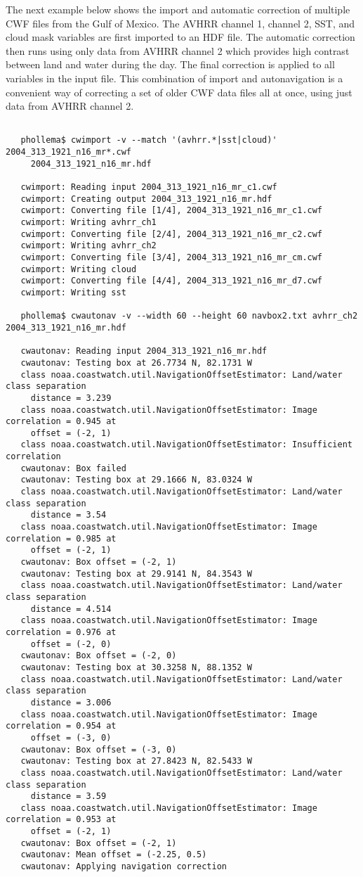  The next example below shows the import and automatic correction of multiple CWF files from the Gulf of Mexico. The AVHRR channel 1, channel 2, SST, and cloud mask variables are first imported to an HDF file. The automatic correction then runs using only data from AVHRR channel 2 which provides high contrast between land and water during the day. The final correction is applied to all variables in the input file. This combination of import and autonavigation is a convenient way of correcting a set of older CWF data files all at once, using just data from AVHRR channel 2.
\begin{verbatim}

   phollema$ cwimport -v --match '(avhrr.*|sst|cloud)' 2004_313_1921_n16_mr*.cwf
     2004_313_1921_n16_mr.hdf

   cwimport: Reading input 2004_313_1921_n16_mr_c1.cwf
   cwimport: Creating output 2004_313_1921_n16_mr.hdf
   cwimport: Converting file [1/4], 2004_313_1921_n16_mr_c1.cwf
   cwimport: Writing avhrr_ch1
   cwimport: Converting file [2/4], 2004_313_1921_n16_mr_c2.cwf
   cwimport: Writing avhrr_ch2
   cwimport: Converting file [3/4], 2004_313_1921_n16_mr_cm.cwf
   cwimport: Writing cloud
   cwimport: Converting file [4/4], 2004_313_1921_n16_mr_d7.cwf
   cwimport: Writing sst

   phollema$ cwautonav -v --width 60 --height 60 navbox2.txt avhrr_ch2 2004_313_1921_n16_mr.hdf

   cwautonav: Reading input 2004_313_1921_n16_mr.hdf
   cwautonav: Testing box at 26.7734 N, 82.1731 W
   class noaa.coastwatch.util.NavigationOffsetEstimator: Land/water class separation 
     distance = 3.239
   class noaa.coastwatch.util.NavigationOffsetEstimator: Image correlation = 0.945 at
     offset = (-2, 1)
   class noaa.coastwatch.util.NavigationOffsetEstimator: Insufficient correlation
   cwautonav: Box failed
   cwautonav: Testing box at 29.1666 N, 83.0324 W
   class noaa.coastwatch.util.NavigationOffsetEstimator: Land/water class separation 
     distance = 3.54
   class noaa.coastwatch.util.NavigationOffsetEstimator: Image correlation = 0.985 at 
     offset = (-2, 1)
   cwautonav: Box offset = (-2, 1)
   cwautonav: Testing box at 29.9141 N, 84.3543 W
   class noaa.coastwatch.util.NavigationOffsetEstimator: Land/water class separation 
     distance = 4.514
   class noaa.coastwatch.util.NavigationOffsetEstimator: Image correlation = 0.976 at 
     offset = (-2, 0)
   cwautonav: Box offset = (-2, 0)
   cwautonav: Testing box at 30.3258 N, 88.1352 W
   class noaa.coastwatch.util.NavigationOffsetEstimator: Land/water class separation 
     distance = 3.006
   class noaa.coastwatch.util.NavigationOffsetEstimator: Image correlation = 0.954 at 
     offset = (-3, 0)
   cwautonav: Box offset = (-3, 0)
   cwautonav: Testing box at 27.8423 N, 82.5433 W
   class noaa.coastwatch.util.NavigationOffsetEstimator: Land/water class separation 
     distance = 3.59
   class noaa.coastwatch.util.NavigationOffsetEstimator: Image correlation = 0.953 at 
     offset = (-2, 1)
   cwautonav: Box offset = (-2, 1)
   cwautonav: Mean offset = (-2.25, 0.5)
   cwautonav: Applying navigation correction
 
\end{verbatim}


